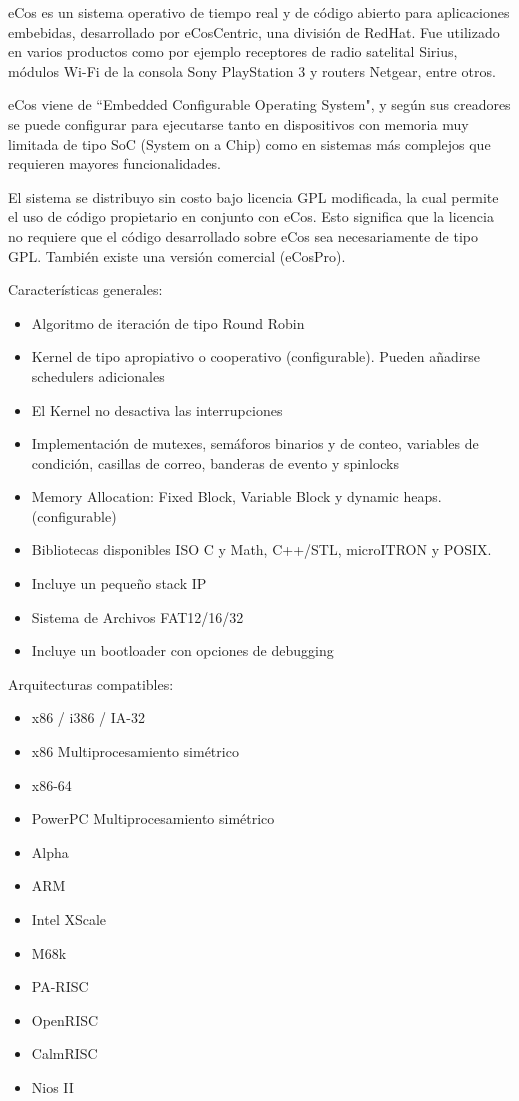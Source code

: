 eCos \cite{Etiqueta35} es un sistema operativo de tiempo real y de código abierto para aplicaciones embebidas, desarrollado por eCosCentric, una división de RedHat. Fue utilizado en varios productos como 
por ejemplo receptores de radio satelital Sirius, módulos Wi-Fi de la consola Sony PlayStation 3 
y routers Netgear, entre otros. 

 eCos viene de ``Embedded Configurable Operating System", y según sus creadores se puede configurar para ejecutarse tanto en dispositivos con memoria muy limitada de tipo SoC (System on a Chip) como en sistemas más complejos que requieren mayores funcionalidades. 
 
El sistema se distribuyo sin costo bajo licencia GPL modificada, la cual permite el uso de código propietario en conjunto con eCos. Esto significa que la licencia no requiere que el código desarrollado sobre eCos sea necesariamente de tipo GPL. También existe una versión comercial 
(eCosPro).

Características generales: 
				\begin{itemize}
				  	\item Algoritmo de iteración de tipo Round Robin
					\item Kernel de tipo apropiativo o cooperativo (configurable). Pueden añadirse schedulers 
 adicionales
					\item El Kernel no desactiva las interrupciones
					\item Implementación de mutexes, semáforos binarios y de conteo, variables de condición, 
 casillas de correo, banderas de evento y spinlocks
					\item Memory Allocation: Fixed Block, Variable Block y dynamic heaps. (configurable)
					\item Bibliotecas disponibles ISO C y Math, C++/STL, microITRON y POSIX. 
					\item  Incluye un pequeño stack IP
					\item Sistema de Archivos FAT12/16/32
					\item Incluye un bootloader con opciones de debugging
				\end{itemize}			

Arquitecturas compatibles:

				\begin{itemize}
				\item x86 / i386 / IA-32
				\item x86 Multiprocesamiento simétrico
				\item x86-64
				\item PowerPC Multiprocesamiento simétrico
				\item Alpha
				\item ARM
				\item Intel XScale
				\item M68k
				\item PA-RISC
				\item OpenRISC
				\item CalmRISC
				\item Nios II
			\end{itemize}			

